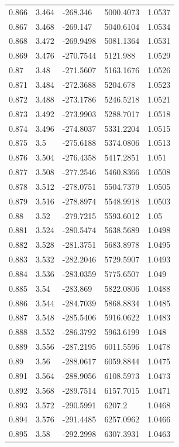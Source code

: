 \begin{tabular}{lllll}
0.866 & 3.464 & -268.346 & 5000.4073 & 1.0537 \\
0.867 & 3.468 & -269.147 & 5040.6104 & 1.0534 \\
0.868 & 3.472 & -269.9498 & 5081.1364 & 1.0531 \\
0.869 & 3.476 & -270.7544 & 5121.988 & 1.0529 \\
0.87 & 3.48 & -271.5607 & 5163.1676 & 1.0526 \\
0.871 & 3.484 & -272.3688 & 5204.678 & 1.0523 \\
0.872 & 3.488 & -273.1786 & 5246.5218 & 1.0521 \\
0.873 & 3.492 & -273.9903 & 5288.7017 & 1.0518 \\
0.874 & 3.496 & -274.8037 & 5331.2204 & 1.0515 \\
0.875 & 3.5 & -275.6188 & 5374.0806 & 1.0513 \\
0.876 & 3.504 & -276.4358 & 5417.2851 & 1.051 \\
0.877 & 3.508 & -277.2546 & 5460.8366 & 1.0508 \\
0.878 & 3.512 & -278.0751 & 5504.7379 & 1.0505 \\
0.879 & 3.516 & -278.8974 & 5548.9918 & 1.0503 \\
0.88 & 3.52 & -279.7215 & 5593.6012 & 1.05 \\
0.881 & 3.524 & -280.5474 & 5638.5689 & 1.0498 \\
0.882 & 3.528 & -281.3751 & 5683.8978 & 1.0495 \\
0.883 & 3.532 & -282.2046 & 5729.5907 & 1.0493 \\
0.884 & 3.536 & -283.0359 & 5775.6507 & 1.049 \\
0.885 & 3.54 & -283.869 & 5822.0806 & 1.0488 \\
0.886 & 3.544 & -284.7039 & 5868.8834 & 1.0485 \\
0.887 & 3.548 & -285.5406 & 5916.0622 & 1.0483 \\
0.888 & 3.552 & -286.3792 & 5963.6199 & 1.048 \\
0.889 & 3.556 & -287.2195 & 6011.5596 & 1.0478 \\
0.89 & 3.56 & -288.0617 & 6059.8844 & 1.0475 \\
0.891 & 3.564 & -288.9056 & 6108.5973 & 1.0473 \\
0.892 & 3.568 & -289.7514 & 6157.7015 & 1.0471 \\
0.893 & 3.572 & -290.5991 & 6207.2 & 1.0468 \\
0.894 & 3.576 & -291.4485 & 6257.0962 & 1.0466 \\
0.895 & 3.58 & -292.2998 & 6307.3931 & 1.0463 \\

\end{tabular}
